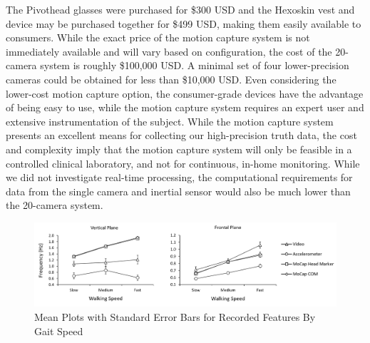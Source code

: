 \documentclass[12pt]{report}
\begin{document}
The Pivothead glasses were purchased for \$300 USD and the Hexoskin vest and device may be purchased together for \$499 USD, making them easily available to consumers. While the exact price of the motion capture system is not immediately available and will vary based on configuration, the cost of the 20-camera system is roughly \$100,000 USD. A minimal set of four lower-precision cameras could be obtained for less than \$10,000 USD. Even considering the lower-cost motion capture option, the consumer-grade devices have the advantage of being easy to use, while the motion capture system requires an expert user and extensive instrumentation of the subject. While the motion capture system presents an excellent means for collecting our high-precision truth data, the cost and complexity imply that the motion capture system will only be feasible in a controlled clinical laboratory, and not for continuous, in-home monitoring. While we did not investigate real-time processing, the computational requirements for data from the single camera and inertial sensor would also be much lower than the 20-camera system.

\begin{figure}
\centering
\includegraphics[width=7in]{figure/meanplots}
\caption{Mean Plots with Standard Error Bars for Recorded Features By Gait Speed}
\label{fig_meanPlots}
\end{figure}
\end{document}

